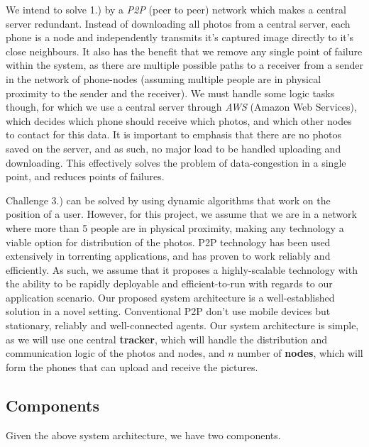\documentclass{report}
\begin{document}
We intend to solve 1.) by a \textit{P2P} (peer to peer) network which makes a central server redundant.
Instead of downloading all photos from a central server, each phone is a node and independently transmits it's captured image directly to it's close neighbours. 
It also has the benefit that we remove any single point of failure within the system, as there are multiple possible paths to a receiver from a sender in the network of phone-nodes (assuming multiple people are in physical proximity to the sender and the receiver). 
We must handle some logic tasks though, for which we use a central server through \textit{AWS} (Amazon Web Services), which decides which phone should receive which photos, and which other nodes to contact for this data. 
It is important to emphasis that there are no photos saved on the server, and as such, no major load to be handled uploading and downloading.
This effectively solves the problem of data-congestion in a single point, and reduces points of failures. 

Challenge 3.) can  be solved by using dynamic algorithms that work on the position of a user. 
However, for this project, we assume that we are in a network where more than 5 people are in physical proximity, making any technology a viable option for distribution of the photos.
\newline
P2P technology has been used extensively in torrenting applications, and has proven to work reliably and efficiently. 
As such, we assume that it proposes a highly-scalable technology with the ability to be rapidly deployable and efficient-to-run with regards to our application scenario.
Our proposed system architecture is a well-established solution in a novel setting.
Conventional P2P don't use mobile devices but stationary, reliably and well-connected agents. 
Our system architecture is simple, as we will use one central \textbf{tracker}, which will handle the distribution and communication logic of the photos and nodes, and $ n $ number of \textbf{nodes}, which will form the phones that can upload and receive the pictures.

\subsection{Components}
Given the above system architecture, we have two components. 
\end{document}
